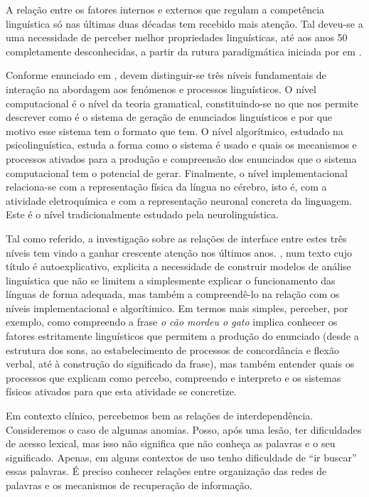 \documentclass[output=paper,colorlinks,citecolor=brown,booklanguage=portuguese]{langscibook}
\begin{document}
A relação entre os fatores internos e externos que regulam a competência linguística só nas últimas duas décadas tem recebido mais atenção. Tal deveu-se a uma necessidade de perceber melhor propriedades linguísticas, até aos anos 50 completamente desconhecidas, a partir da rutura paradigmática iniciada por \citeauthor{Chomsky1957} em \citeyear{Chomsky1957}.

Conforme enunciado em \citet{Sprouse2013}, devem distinguir-se três níveis fundamentais de interação na abordagem aos fenómenos e processos linguísticos. O nível computacional é o nível da teoria gramatical, constituindo-se no que nos permite descrever como é o sistema de geração de enunciados linguísticos e por que motivo esse sistema tem o formato que tem. O nível algorítmico, estudado na psicolinguística, estuda a forma como o sistema é usado e quais os mecanismos e processos ativados para a produção e compreensão dos enunciados que o sistema computacional tem o potencial de gerar. Finalmente, o nível implementacional relaciona-se com a representação física da língua no cérebro, isto é, com a atividade eletroquímica e com a representação neuronal concreta da linguagem. Este é o nível tradicionalmente estudado pela neurolinguística.

Tal como referido, a investigação sobre as relações de interface entre estes três níveis tem vindo a ganhar crescente atenção nos últimos anos. \citet{Chomsky2001}, num texto cujo título é autoexplicativo, explicita a necessidade de construir modelos de análise linguística que não se limitem a simplesmente explicar o funcionamento das línguas de forma adequada, mas também a compreendê-lo na relação com os níveis implementacional e algorítimico. Em termos mais simples, perceber, por exemplo, como compreendo a frase \emph{o cão mordeu o gato} implica conhecer os fatores estritamente linguísticos que permitem a produção do enunciado (desde a estrutura dos sons, ao estabelecimento de processos de concordância e flexão verbal, até à construção do significado da frase), mas também entender quais os processos que explicam como percebo, compreendo e interpreto e os sistemas físicos ativados para que esta atividade se concretize.

Em contexto clínico, percebemos bem as relações de interdependência. Consideremos o caso de algumas anomias. Posso, após uma lesão, ter dificuldades de acesso lexical, mas isso não significa que não conheça as palavras e o seu significado. Apenas, em alguns contextos de uso tenho dificuldade de “ir buscar” essas palavras. É preciso conhecer relações entre organização das redes de palavras e os mecanismos de recuperação de informação.
\end{document}
